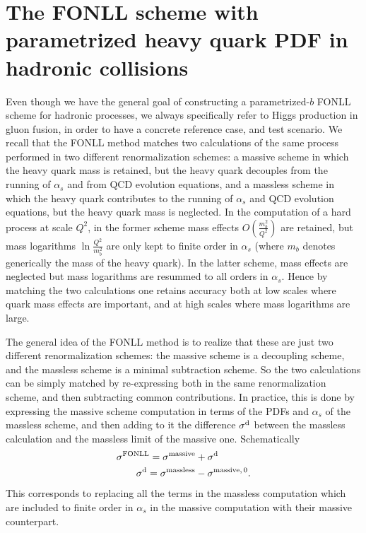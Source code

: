 \section{The FONLL scheme with parametrized heavy quark PDF
  in hadronic collisions}
\label{sec:FONLL-HI}

Even though we have the general goal of constructing a parametrized-$b$
FONLL scheme for hadronic processes, we  always specifically refer to Higgs
production in gluon fusion, in order to have  a concrete reference
case, and  test scenario. We recall that the FONLL
method matches two calculations of the same process
performed in two different renormalization schemes: a massive scheme
in which the heavy quark mass is retained, but the heavy quark
decouples from the running of $\alpha_s$ and from QCD evolution
equations, and a massless scheme in which the heavy quark contributes
to the running of $\alpha_s$ and QCD evolution
equations, but the heavy quark mass is neglected.
In the computation of a hard process at scale $Q^2$, in the former scheme
mass effects $O\left(\frac {m_b^2}{Q^2}\right)$
are retained, but mass logarithms $\ln\frac{Q^2}{m_b^2}$
 are only
kept to finite order in $\alpha_s$ (where $m_b$ denotes generically
the mass of the heavy quark). In the latter scheme, mass effects
are neglected but mass logarithms are resummed to all orders in
$\alpha_s$. Hence by matching the two calculations one retains
accuracy both at low scales where quark mass effects are important, and
at high scales where mass logarithms are large.

The general idea of the FONLL method is to realize that these are just
two different renormalization schemes: the massive scheme is a
decoupling scheme, and the massless scheme is a minimal subtraction
scheme. So the two calculations can be simply matched by re-expressing
both in the same renormalization scheme, and then subtracting common
contributions. In practice, this is done by expressing the massive
scheme computation in terms of the PDFs and $\alpha_s$ of the
massless scheme, and then adding to it the difference $\sigma ^{\rm
  d}$
between the massless calculation and the massless limit of the
massive one. Schematically
\begin{align}\label{eq:fonlldef}
&  \sigma^{\text{FONLL}} = \sigma^{\rm massive} +\sigma ^{\rm d}\\
&\qquad \sigma ^{\rm d}=\sigma^{\rm massless}-\sigma^{\rm massive,\,0}.\label{eq:fonlldiff}
\end{align}
This corresponds to replacing all the terms in the massless
computation which are included to finite order in $\alpha_s$ in the
massive computation with their massive counterpart.

